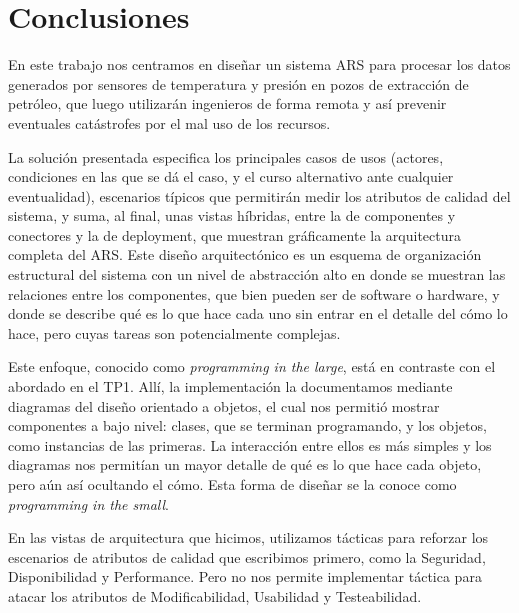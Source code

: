 \section{Conclusiones}

En este trabajo nos centramos en diseñar un sistema ARS para procesar los datos generados por sensores de temperatura y presión en pozos de extracción de petróleo, que luego utilizarán ingenieros de forma remota y así prevenir eventuales catástrofes por el mal uso de los recursos.

La solución presentada especifica los principales casos de usos (actores, condiciones en las que se dá el caso, y el curso alternativo ante cualquier eventualidad), escenarios típicos que permitirán medir los atributos de calidad del sistema, y suma, al final, unas vistas híbridas, entre la de componentes y conectores y la de deployment, que muestran gráficamente la arquitectura completa del ARS. Este diseño arquitectónico es un esquema de organización estructural del sistema con un nivel de abstracción alto en donde se muestran las relaciones entre los componentes, que bien pueden ser de software o hardware, y donde se describe qué es lo que hace cada uno sin entrar en el detalle del cómo lo hace, pero cuyas tareas son potencialmente complejas.

Este enfoque, conocido como \textit{programming in the large}, está en contraste con el abordado en el TP1. Allí, la implementación la documentamos mediante diagramas del diseño orientado a objetos, el cual nos permitió mostrar componentes a bajo nivel: clases, que se terminan programando, y los objetos, como instancias de las primeras. La interacción entre ellos es más simples y los diagramas nos permitían un mayor detalle de qué es lo que hace cada objeto, pero aún así ocultando el cómo. Esta forma de diseñar se la conoce como \textit{programming in the small}.

En las vistas de arquitectura que hicimos, utilizamos tácticas para reforzar los escenarios de atributos de calidad que escribimos primero, como la Seguridad, Disponibilidad y Performance. Pero no nos permite implementar táctica para atacar los atributos de Modificabilidad, Usabilidad y Testeabilidad.



